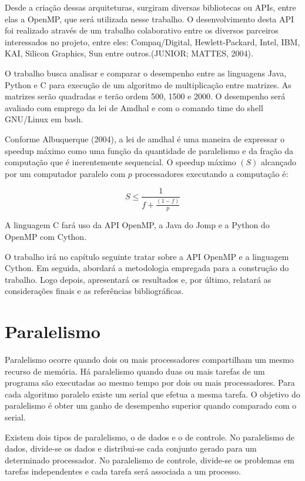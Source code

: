 \documentclass[a4paper,12pt]{article}
\begin{document}
	Desde a criação dessas arquiteturas, surgiram diversas bibliotecas ou APIs, entre elas a OpenMP, que será utilizada nesse trabalho. O desenvolvimento  desta API foi realizado através de um trabalho colaborativo entre os diversos parceiros interessados no projeto, entre eles: Compaq/Digital, Hewlett-Packard, Intel, IBM, KAI, Silicon Graphics, Sun entre outros.(JUNIOR; MATTES, 2004). 
	
	O trabalho busca analisar e comparar o desempenho entre as linguagens Java, Python e C para execução de um algoritmo de multiplicação entre matrizes. As matrizes serão quadradas e terão ordem 500, 1500 e 2000. O desempenho será avaliado com emprego da lei de Amdhal e com o comando time do shell GNU/Linux em bash. 
	
	Conforme Albuquerque (2004), a lei de amdhal é uma maneira de expressar o speedup máximo como uma função da quantidade de paralelismo e da fração da computação que é inerentemente sequencial. O speedup máximo $(S)$ alcançado por um computador paralelo com $p$ processadores executando a computação é:
	
\begin{equation}
  \label{eq:amdhal}
   S \le \frac{1}{f + \frac{(1-f)}{p}}
\end{equation}

A linguagem C fará uso da API OpenMP, a Java do Jomp e a Python do  OpenMP com Cython.

O trabalho irá no capítulo seguinte tratar sobre a API OpenMP e a linguagem Cython. Em seguida, abordará a metodologia empregada para a construção do trabalho. Logo depois, apresentará os resultados e, por último, relatará as considerações finais e as referências bibliográficas. 

\section{Paralelismo}
Paralelismo ocorre quando dois ou mais processadores compartilham um mesmo recurso de memória. Há paralelismo quando duas ou mais tarefas de um programa são executadas ao mesmo tempo por dois ou mais processadores. Para cada algoritmo paralelo existe um serial que efetua a mesma tarefa. O objetivo do paralelismo é obter um ganho de desempenho superior quando comparado com o serial.

Existem dois tipos de paralelismo, o de dados e o de controle. No paralelismo de dados, divide-se os dados e distribui-se cada conjunto gerado para um determinado processador. No paralelismo de controle, divide-se os problemas em tarefas independentes e cada tarefa será associada a um processo.  
\end{document}
